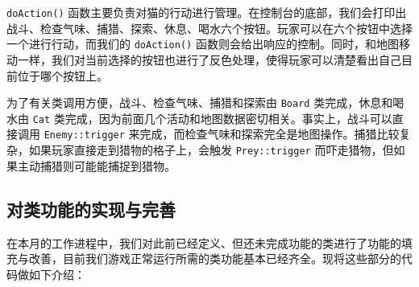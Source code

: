 \documentclass[hyperref,UTF8,a4paper]{ctexart}
\begin{document}
\texttt{doAction()}
函数主要负责对猫的行动进行管理。在控制台的底部，我们会打印出战斗、检查气味、捕猎、探索、休息、喝水六个按钮。玩家可以在六个按钮中选择一个进行行动，而我们的
\texttt{doAction()}
函数则会给出响应的控制。同时，和地图移动一样，我们对当前选择的按钮也进行了反色处理，使得玩家可以清楚看出自己目前位于哪个按钮上。

为了有关类调用方便，战斗、检查气味、捕猎和探索由 \texttt{Board}
类完成，休息和喝水由 \texttt{Cat}
类完成，因为前面几个活动和地图数据密切相关。事实上，战斗可以直接调用
\texttt{Enemy::trigger}
来完成，而检查气味和探索完全是地图操作。捕猎比较复杂，如果玩家直接走到猎物的格子上，会触发
\texttt{Prey::trigger} 而吓走猎物，但如果主动捕猎则可能能捕捉到猎物。

\hypertarget{ux5bf9ux7c7bux529fux80fdux7684ux5b9eux73b0ux4e0eux5b8cux5584}{%
\subsection{对类功能的实现与完善}\label{ux5bf9ux7c7bux529fux80fdux7684ux5b9eux73b0ux4e0eux5b8cux5584}}

在本月的工作进程中，我们对此前已经定义、但还未完成功能的类进行了功能的填充与改善，目前我们游戏正常运行所需的类功能基本已经齐全。现将这些部分的代码做如下介绍：
\end{document}
